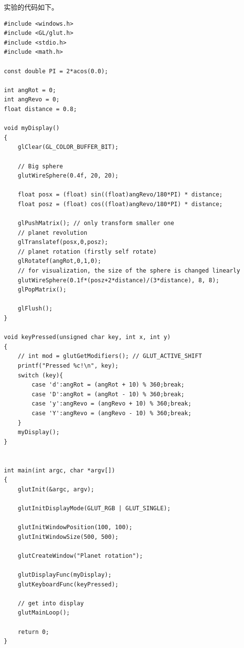 \documentclass[logo,reportComp]{thesis}
\begin{document}
实验的代码如下。
\begin{lstlisting}
#include <windows.h>
#include <GL/glut.h>
#include <stdio.h>
#include <math.h>

const double PI = 2*acos(0.0);

int angRot = 0;
int angRevo = 0;
float distance = 0.8;

void myDisplay()
{
    glClear(GL_COLOR_BUFFER_BIT);

    // Big sphere
    glutWireSphere(0.4f, 20, 20);

    float posx = (float) sin((float)angRevo/180*PI) * distance;
    float posz = (float) cos((float)angRevo/180*PI) * distance;

    glPushMatrix(); // only transform smaller one
    // planet revolution
    glTranslatef(posx,0,posz);
    // planet rotation (firstly self rotate)
    glRotatef(angRot,0,1,0);
    // for visualization, the size of the sphere is changed linearly
    glutWireSphere(0.1f*(posz+2*distance)/(3*distance), 8, 8);
    glPopMatrix();

    glFlush();
}

void keyPressed(unsigned char key, int x, int y)
{
    // int mod = glutGetModifiers(); // GLUT_ACTIVE_SHIFT
    printf("Pressed %c!\n", key);
    switch (key){
        case 'd':angRot = (angRot + 10) % 360;break;
        case 'D':angRot = (angRot - 10) % 360;break;
        case 'y':angRevo = (angRevo + 10) % 360;break;
        case 'Y':angRevo = (angRevo - 10) % 360;break;
    }
    myDisplay();
}


int main(int argc, char *argv[])
{
    glutInit(&argc, argv);

    glutInitDisplayMode(GLUT_RGB | GLUT_SINGLE);

    glutInitWindowPosition(100, 100);
    glutInitWindowSize(500, 500);

    glutCreateWindow("Planet rotation");

    glutDisplayFunc(myDisplay);
    glutKeyboardFunc(keyPressed);

    // get into display
    glutMainLoop();

    return 0;
}
\end{lstlisting}
\end{document}
